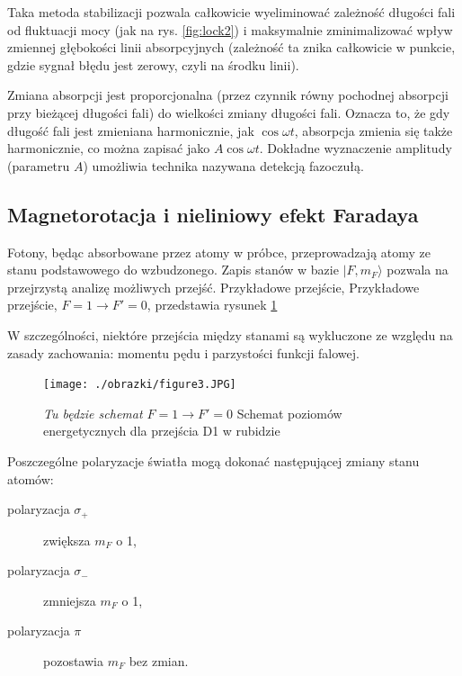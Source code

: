 \documentclass[a4paper,10pt]{article}
\begin{document}
 Taka metoda stabilizacji pozwala całkowicie wyeliminować zależność długości fali od fluktuacji mocy (jak na rys. \ref{fig:lock2})  i maksymalnie zminimalizować wpływ zmiennej głębokości linii absorpcyjnych (zależność ta znika całkowicie w punkcie, gdzie sygnał błędu jest zerowy, czyli na środku linii).

Zmiana absorpcji jest proporcjonalna (przez czynnik równy pochodnej absorpcji przy bieżącej długości fali) do wielkości zmiany długości fali. Oznacza to, że gdy długość fali jest zmieniana harmonicznie, jak $\cos \omega t$, absorpcja zmienia się także harmonicznie, co można zapisać jako $A \cos \omega t$. Dokładne wyznaczenie amplitudy (parametru $A$)
umożliwia technika nazywana detekcją fazoczułą.

\subsection{Magnetorotacja i nieliniowy efekt Faradaya}

Fotony, będąc absorbowane przez atomy w próbce, przeprowadzają atomy ze stanu podstawowego do wzbudzonego.
Zapis stanów w bazie $|F,m_F\rangle$ pozwala na przejrzystą analizę możliwych przejść.
Przykładowe przejście, Przykładowe przejście, $F=1 \rightarrow F'=0$, przedstawia rysunek \ref{poziomyL}

W szczególności, niektóre przejścia między stanami są wykluczone ze względu na zasady zachowania: momentu pędu i parzystości funkcji falowej. 

\begin{figure}
\begin{center}
 \texttt{[image: ./obrazki/figure3.JPG]}
\end{center}
\caption{\emph{Tu będzie schemat $F=1 \rightarrow F'=0$} Schemat poziomów energetycznych dla przejścia D1 w rubidzie}
\label{poziomyL}
\end{figure}

Poszczególne polaryzacje światła mogą dokonać następującej zmiany stanu atomów:
\begin{center}
\begin{description}
\item[polaryzacja $\sigma_+$] zwiększa $m_F$ o 1,
\item[polaryzacja $\sigma_-$] zmniejsza $m_F$ o 1,
\item[polaryzacja $\pi$] pozostawia $m_F$ bez zmian.
\end{description}
\end{center}
\end{document}
